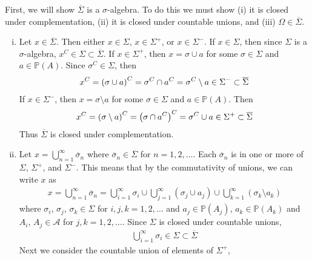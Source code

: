 \documentclass[12pt]{article}
\theoremstyle{plain}
\begin{document}
First, we will show $\overline{\Sigma}$ is a $\sigma$-algebra.  To do this we must show (i) it is closed under complementation, (ii) it is closed under countable unions, and (iii) $\Omega \in \overline{\Sigma}$.
\begin{enumerate}[(i)]
    \item
        Let $x \in \overline{\Sigma}$.  Then either $x \in \Sigma$, $x \in \Sigma^+$, or $x \in \Sigma^-$.  If $x \in \Sigma$, then since $\Sigma$ is a $\sigma$-algebra, $x^C \in \Sigma \subset \overline{\Sigma}$.  If $x \in \Sigma^+$, then $x = \sigma \cup a$ for some $\sigma \in \Sigma$ and $a \in \mathbb{P}(A)$.  Since $\sigma^C \in \Sigma$, then
        \begin{align*}
            x^C = \qty(\sigma \cup a)^C = \sigma^C \cap a^C = \sigma^C \setminus a \in \Sigma^- \subset \overline{\Sigma}
        \end{align*}
        If $x \in \Sigma^-$, then $x = \sigma \setminus a$ for some $\sigma \in \Sigma$ and $a \in \mathbb{P}(A)$.  Then
        \begin{align*}
            x^C = \qty(\sigma \setminus a)^C = \qty(\sigma \cap a^C)^C = \sigma^C \cup a \in \Sigma^+ \subset \overline{\Sigma}
        \end{align*}
        Thus $\overline{\Sigma}$ is closed under complementation.
    \item
        Let $x = \bigcup_{n=1}^\infty \overline{\sigma}_n$ where $\overline{\sigma}_n \in \overline{\Sigma}$ for $n = 1, 2, \dots$.  Each $\overline{\sigma}_n$ is in one or more of $\Sigma$, $\Sigma^+$, and $\Sigma^-$.  This means that by the commutativity of unions, we can write $x$ as
        \begin{align*}
            x = \bigcup_{n=1}^\infty \overline{\sigma}_n = \bigcup_{i=1}^\infty \sigma_i \cup \bigcup_{j=1}^\infty (\sigma_j \cup a_j) \cup \bigcup_{k=1}^\infty (\sigma_k \setminus a_k)
        \end{align*}
        where $\sigma_i$, $\sigma_j$, $\sigma_k \in \Sigma$ for $i,j,k = 1, 2, \dots$ and $a_j \in \mathbb{P}(A_j)$, $a_k \in \mathbb{P}(A_k)$ and $A_i$, $A_j \in \mathcal{A}$ for $j, k = 1, 2, \dots$.  Since $\Sigma$ is closed under countable unions,
        \begin{align*}
            \bigcup_{i=1}^\infty \sigma_i \in \Sigma \subset \overline{\Sigma}
        \end{align*}
        Next we consider the countable union of elements of $\Sigma^+$,
        \begin{align*}

\end{align*}
\end{enumerate}
\end{document}
